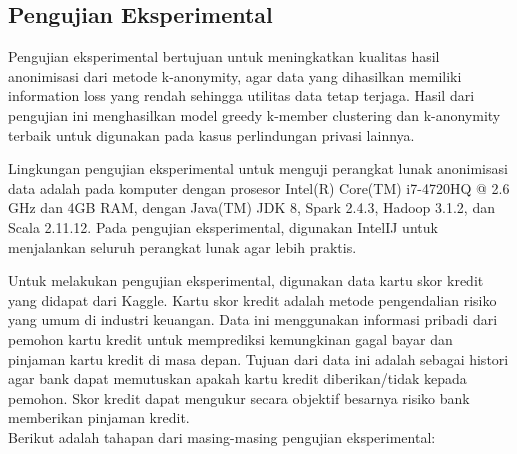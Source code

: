 \newpage
\subsection{Pengujian Eksperimental}
Pengujian eksperimental bertujuan untuk meningkatkan kualitas hasil anonimisasi dari metode k-anonymity, agar data yang dihasilkan memiliki information loss yang  rendah sehingga utilitas data tetap terjaga. Hasil dari pengujian ini menghasilkan model greedy k-member clustering dan k-anonymity terbaik untuk digunakan pada kasus perlindungan privasi lainnya. 

Lingkungan pengujian eksperimental untuk menguji perangkat lunak anonimisasi data adalah pada komputer dengan prosesor Intel(R) Core(TM) i7-4720HQ @ 2.6 GHz dan 4GB RAM, dengan Java(TM) JDK 8, Spark 2.4.3, Hadoop 3.1.2, dan Scala 2.11.12. Pada pengujian eksperimental, digunakan IntelIJ untuk menjalankan seluruh perangkat lunak agar lebih praktis.

Untuk melakukan pengujian eksperimental, digunakan data kartu skor kredit yang didapat dari Kaggle. Kartu skor kredit adalah metode pengendalian risiko yang umum di industri keuangan. Data ini menggunakan informasi pribadi dari pemohon kartu kredit untuk memprediksi kemungkinan gagal bayar dan pinjaman kartu kredit di masa depan. Tujuan dari data ini adalah sebagai histori agar bank dapat memutuskan apakah kartu kredit diberikan/tidak kepada pemohon. Skor kredit dapat mengukur secara objektif besarnya risiko bank memberikan pinjaman kredit. \\

\noindent Berikut adalah tahapan dari masing-masing pengujian eksperimental:

